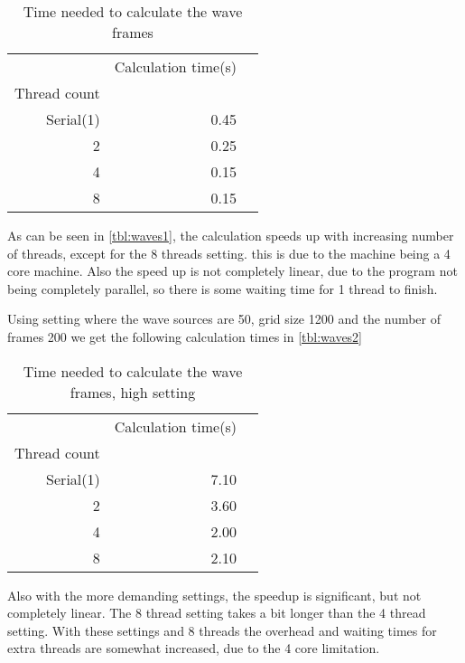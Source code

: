 \documentclass[a4paper]{article}
\begin{document}
\begin{table}
	\centering
	\caption{Time needed to calculate the wave frames}
	\label{tbl:waves1}
	\begin{tabular}{r|r|r}
		& Calculation time(s) \\
		Thread count \\ \cline{2-4}
		 Serial(1) & 0.45  \\
		 2 & 0.25  \\
		 4 & 0.15  \\
		 8 & 0.15  \\
		
	\end{tabular}
\end{table}
\begin{enumerate}
As can be seen in \autoref{tbl:waves1}, the calculation speeds up with increasing number of threads, except for the 8 threads setting. this is due to the machine being a 4 core machine. Also the speed up is not completely linear, due to the program not being completely parallel, so there is some waiting time for 1 thread to finish.


Using setting where the wave sources are 50, grid size 1200 and the number of frames 200 we get the following calculation times in \autoref{tbl:waves2}
\end{enumerate} 
\begin{table}
	\centering
	\caption{Time needed to calculate the wave frames, high setting}
	\label{tbl:waves2}
	\begin{tabular}{r|r|r}
		& Calculation time(s) \\
		Thread count \\ \cline{2-4}
		 Serial(1) & 7.10  \\
		 2 & 3.60  \\
		 4 & 2.00 \\
		 8 & 2.10  \\
		
	\end{tabular}
\end{table}
\begin{enumerate}
Also with the more demanding settings, the speedup is significant, but not completely linear. The 8 thread setting takes a bit longer than the 4 thread setting. With these settings and 8 threads the overhead and waiting times for extra threads are somewhat increased, due to the 4 core limitation. 
\end{enumerate}

\newpage
\appendix
\end{document}
